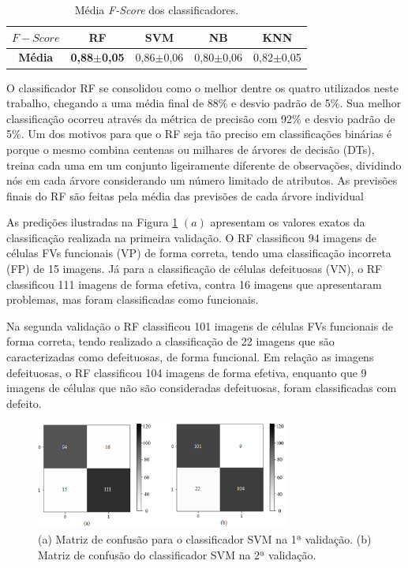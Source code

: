 \documentclass[a4paper]{ifacconf}
\begin{document}
\begin{table}[h]	
	\centering 
	\caption{Média \textit{F-Score} dos classificadores.}\label{tab:06}	
		\begin{tabular}{ccccc}\hline
			    \textbf{$F-Score$} & \textbf{RF} & \textbf{SVM} & \textbf{NB} & \textbf{KNN}\\
			\hline
			 \textbf{Média} & \textbf{0,88$\pm$0,05} & 0,86$\pm$0,06 & 0,80$\pm$0,06 & 0,82$\pm$0,05 \\
			\hline
		\end{tabular}
\end{table}

O classificador RF se consolidou como o melhor dentre os quatro utilizados neste trabalho, chegando a uma média final de 88\% e desvio padrão de 5\%. Sua melhor classificação
ocorreu através da métrica de precisão com 92\% e desvio padrão de 5\%. Um dos motivos para que o RF seja tão preciso em classificações binárias é porque o mesmo combina centenas ou milhares de árvores de decisão (DTs), treina cada uma em um conjunto ligeiramente diferente de observações, dividindo nós em cada árvore considerando um número limitado de atributos. As previsões finais do RF são feitas pela média das previsões de cada árvore individual


As predições ilustradas na Figura \ref{fig:07} $(a)$ apresentam os valores exatos da classificação realizada na primeira validação. O RF classificou 94 imagens de células FVs funcionais (VP) de forma correta, tendo uma classificação incorreta (FP) de 15 imagens. Já para a classificação de células defeituosas (VN), o RF classificou 111 imagens de forma efetiva, contra 16 imagens que apresentaram problemas, mas foram classificadas como funcionais.

Na segunda validação o RF classificou 101 imagens de células FVs funcionais de forma correta, tendo realizado a classificação de 22 imagens que são caracterizadas como defeituosas, de forma funcional. Em relação as imagens defeituosas, o RF classificou 104 imagens de forma efetiva, enquanto que 9 imagens de células que não são consideradas defeituosas, foram classificadas com defeito.

\begin{figure}[hbt!]
\begin{center}
\includegraphics[width=8.4cm]{imgs/Fig07.png}    %
\caption{(a) Matriz de confusão para o classificador SVM na 1ª validação. (b) Matriz de confusão do classificador SVM na 2ª validação.} 
\label{fig:07}
\end{center}
\end{figure}
\end{document}
